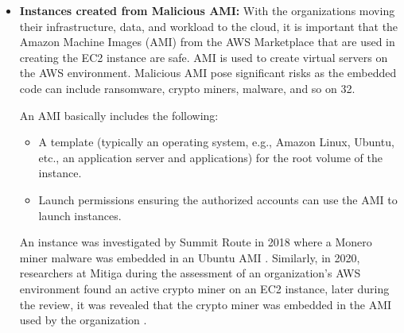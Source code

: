 \begin{itemize}
    \item \textbf{Instances created from Malicious AMI:} With the organizations moving their infrastructure, data,
    and workload to the cloud, it is important that the Amazon Machine Images (AMI) from the AWS Marketplace that are
    used in creating the EC2 instance are safe. AMI is used to create virtual servers on the AWS environment.
    Malicious AMI pose significant risks as the embedded code can include ransomware, crypto miners, malware, and so
    on {32}.

    An AMI basically includes the following:
    \begin{itemize}
        \item A template (typically an operating system, e.g., Amazon Linux, Ubuntu, etc., an application server and applications) for the root volume of the instance.
    \end{itemize}
    \begin{itemize}
        \item Launch permissions ensuring the authorized accounts can use the AMI to launch instances.
    \end{itemize}
    An instance was investigated by Summit Route in 2018 where a Monero miner malware was embedded in an Ubuntu AMI \cite{47}.
    Similarly, in 2020, researchers at Mitiga during the assessment of an organization’s AWS environment found an
    active crypto miner on an EC2 instance, later during the review, it was revealed that the crypto miner was
    embedded in the AMI used by the organization \cite{48}.
\end{itemize}

